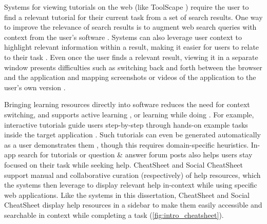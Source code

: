 Systems for viewing tutorials on the web (like ToolScape \cite{Kim2014, Kim2013}) require the user to find a relevant tutorial for their current task from a set of search results. One way to improve the relevance of search results is to augment web search queries with context from the user's software \cite{Ekstrand2011, Brandt2010, Matejka2011a}. Systems can also leverage user context to highlight relevant information within a result, making it easier for users to relate to their task \cite{Ekstrand2011, Fourney2014Intertwine}. Even once the user finds a relevant result, viewing it in a separate window presents difficulties such as switching back and forth between the browser and the application and mapping screenshots or videos of the application to the user's own version \cite{Kelleher2005, Pongnumkul2011}. 

Bringing learning resources directly into software reduces the need for context switching, and supports active learning \cite{Bonwell1991}, or learning while doing \cite{Grossman2010a, Matejka2011, Ichinco2017, Matejka2009, Greene2002}. For example, interactive tutorials guide users step-by-step through hands-on example tasks inside the target application \cite{Kelleher2005, Lafreniere2014a, Pongnumkul2011}. Such tutorials can even be generated automatically as a user demonstrates them \cite{Grabler2009}, though this requires domain-specific heuristics. In-app search for tutorials \cite{Lafreniere2014a} or question \& answer forum posts \cite{Chilana2012} also helps users stay focused on their task while seeking help. CheatSheet \cite{Vermette2015} and Social CheatSheet \cite{Vermette2017} support manual and collaborative curation (respectively) of help resources, which the systems then leverage to display relevant help in-context while using specific web applications. Like the systems in this dissertation, CheatSheet and Social CheatSheet display help resources in a sidebar to make them easily accessible and searchable in context while completing a task (\autoref{fig:intro_cheatsheet}).

